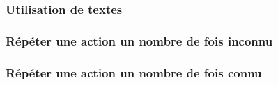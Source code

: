 \subsubsection{Utilisation de textes}
	 

\subsubsection{Répéter une action un nombre de fois \og inconnu \fg}
	 

\subsubsection{Répéter une action un nombre de fois \og connu \fg}
	 


